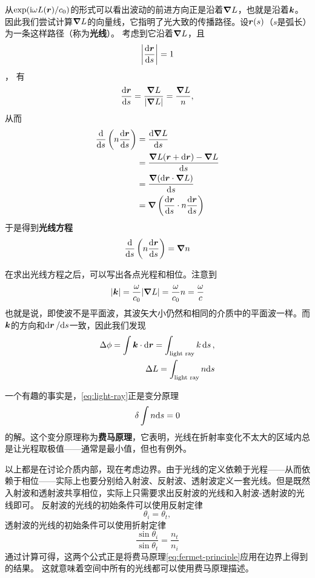 \documentclass[UTF8, a4paper]{ctexart}
\newcommand*{\ii}{\mathrm{i}}
\begin{document}
从$\exp (\ii \omega L(\vb*{r}) / c_0)$的形式可以看出波动的前进方向正是沿着$\grad{L}$，也就是沿着$\vb*{k}$。
因此我们尝试计算$\grad{L}$的向量线，它指明了光大致的传播路径。设$\vb*{r}(s)$（$s$是弧长）为一条这样路径（称为\textbf{光线}）。
考虑到它沿着$\grad{L}$，且
\[
    \abs{\dv{\vb*{r}}{s}} = 1
\]，
有
\[
    \dv{\vb*{r}}{s} = \frac{\grad{L}}{\abs{\grad{L}}} = \frac{\grad{L}}{n},
\]
从而
\[
    \begin{aligned}
        \dv{s}\left(n \dv{\vb*{r}}{s}\right) &= \dv{\grad{L}}{s} \\
        &= \frac{\grad{L}(\vb*{r} + \dd \vb*{r}) - \grad{L}}{\dd s} \\
        &= \frac{\grad{(\dd \vb*{r} \cdot \grad{L})}}{\dd s} \\
        &= \grad{\left( \dv{\vb*{r}}{s} \cdot n \dv{\vb*{r}}{s} \right)}
    \end{aligned}
\]
于是得到\textbf{光线方程}
\begin{equation}
    \dv{s} \left( n \dv{\vb*{r}}{s} \right) = \grad{n}
    \label{eq:light-ray}
\end{equation}

在求出光线方程之后，可以写出各点光程和相位。注意到
\[
    \abs{\vb*{k}} = \frac{\omega}{c_0} \abs{\grad{L}} = \frac{\omega}{c_0} n = \frac{\omega}{c}
\]
也就是说，即使波不是平面波，其波矢大小仍然和相同的介质中的平面波一样。而$\vb*{k}$的方向和$\dd{\vb*{r}} / \dd s$一致，因此我们发现
\begin{equation}
    \begin{split}
        \Delta \phi = \int \vb*{k} \cdot \dd{\vb*{r}} = \int_\text{light ray} k \dd{s}, \\
        \Delta L = \int_\text{light ray} n \dd s
    \end{split}
    \label{eq:light-ray-and-phrase}
\end{equation}

一个有趣的事实是，\eqref{eq:light-ray}正是变分原理
\begin{equation}
    \var \int n \dd s = 0
    \label{eq:fermet-principle}
\end{equation}
的解。这个变分原理称为\textbf{费马原理}，它表明，光线在折射率变化不太大的区域内总是让光程取极值——通常是最小值，但也有例外。

以上都是在讨论介质内部，现在考虑边界。由于光线的定义依赖于光程——从而依赖于相位——实际上也要分别给入射波、反射波、透射波定义一套光线。但是既然入射波和透射波共享相位，实际上只需要求出反射波的光线和入射波-透射波的光线即可。
反射波的光线的初始条件可以使用反射定律
\[
    \theta_i = \theta_t,
\]
透射波的光线的初始条件可以使用折射定律
\[
    \frac{\sin \theta_i}{\sin \theta_t} = \frac{n_t}{n_i}
\]
通过计算可得，这两个公式正是将费马原理\eqref{eq:fermet-principle}应用在边界上得到的结果。
这就意味着空间中所有的光线都可以使用费马原理描述。
\end{document}
